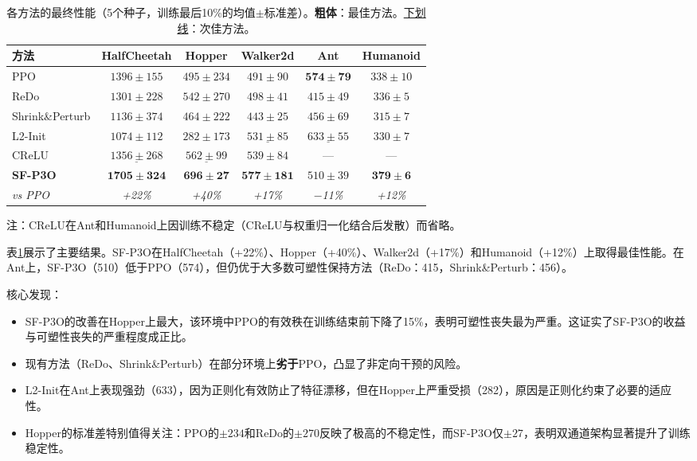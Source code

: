 \documentclass[twocolumn]{article}
\begin{document}
\begin{table}[t]
\centering
\caption{各方法的最终性能（5个种子，训练最后10\%的均值$\pm$标准差）。\textbf{粗体}：最佳方法。\underline{下划线}：次佳方法。}
\label{tab:main_results}
\begin{tabular}{lccccc}
\toprule
\textbf{方法} & \textbf{HalfCheetah} & \textbf{Hopper} & \textbf{Walker2d} & \textbf{Ant} & \textbf{Humanoid} \\
\midrule
PPO              & $1396 \pm 155$ & $495 \pm 234$  & $491 \pm 90$  & $\mathbf{574 \pm 79}$  & $338 \pm 10$ \\
ReDo             & $1301 \pm 228$ & $542 \pm 270$  & $498 \pm 41$  & $415 \pm 49$  & $336 \pm 5$ \\
Shrink\&Perturb  & $1136 \pm 374$ & $464 \pm 222$  & $443 \pm 25$  & $456 \pm 69$  & $315 \pm 7$ \\
L2-Init          & $1074 \pm 112$ & $282 \pm 173$  & $\underline{531 \pm 85}$  & $\underline{633 \pm 55}$  & $330 \pm 7$ \\
CReLU            & $\underline{1356 \pm 268}$ & $\underline{562 \pm 99}$   & $539 \pm 84$  & ---           & --- \\
\midrule
\textbf{SF-P3O}  & $\mathbf{1705 \pm 324}$ & $\mathbf{696 \pm 27}$   & $\mathbf{577 \pm 181}$ & $510 \pm 39$  & $\mathbf{379 \pm 6}$ \\
\quad \textit{vs PPO} & \textit{+22\%} & \textit{+40\%} & \textit{+17\%} & \textit{$-$11\%} & \textit{+12\%} \\
\bottomrule
\end{tabular}
\vspace{0.3em}

{\small 注：CReLU在Ant和Humanoid上因训练不稳定（CReLU与权重归一化结合后发散）而省略。}
\end{table}

表\ref{tab:main_results}展示了主要结果。SF-P3O在HalfCheetah（+22\%）、Hopper（+40\%）、Walker2d（+17\%）和Humanoid（+12\%）上取得最佳性能。在Ant上，SF-P3O（510）低于PPO（574），但仍优于大多数可塑性保持方法（ReDo：415，Shrink\&Perturb：456）。

核心发现：
\begin{itemize}[leftmargin=*]
    \item SF-P3O的改善在Hopper上最大，该环境中PPO的有效秩在训练结束前下降了15\%，表明可塑性丧失最为严重。这证实了SF-P3O的收益与可塑性丧失的严重程度成正比。
    \item 现有方法（ReDo、Shrink\&Perturb）在部分环境上\textbf{劣于}PPO，凸显了非定向干预的风险。
    \item L2-Init在Ant上表现强劲（633），因为正则化有效防止了特征漂移，但在Hopper上严重受损（282），原因是正则化约束了必要的适应性。
    \item Hopper的标准差特别值得关注：PPO的$\pm 234$和ReDo的$\pm 270$反映了极高的不稳定性，而SF-P3O仅$\pm 27$，表明双通道架构显著提升了训练稳定性。
\end{itemize}
\end{document}
